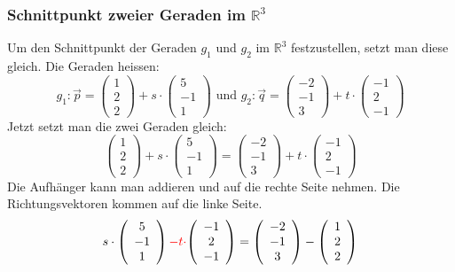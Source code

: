 \subsubsection{Schnittpunkt zweier Geraden im $\mathbb{R}^3$}
Um den Schnittpunkt der Geraden $g_1$ und $g_2$ im $\mathbb{R}^3$ festzustellen, setzt man
diese gleich. Die Geraden heissen:
\[ g_1 : \vec{p} = \left( \begin{array}{c} 1 \\2 \\2 \end{array} \right)
  + s \cdot \left( \begin{array}{c} 5 \\ -1 \\ 1 \end{array} \right)
  \text{ und }
  g_2 : \vec{q} = \left( \begin{array}{c} -2 \\-1 \\3 \end{array} \right)
  + t \cdot \left( \begin{array}{c} -1 \\ 2 \\ -1 \end{array} \right) \]
Jetzt setzt man die zwei Geraden gleich:
\[ \left( \begin{array}{c} 1 \\2 \\2 \end{array} \right)
  + s \cdot \left( \begin{array}{c} 5 \\ -1 \\ 1 \end{array} \right)
  = \left( \begin{array}{c} -2 \\-1 \\3 \end{array} \right)
  + t \cdot \left( \begin{array}{c} -1 \\ 2 \\ -1 \end{array} \right) \]
Die Aufhänger kann man addieren und auf die rechte Seite nehmen. Die
Richtungsvektoren kommen auf die linke Seite.
\[
  s \cdot \left( \begin{array}{c} 5 \\ -1 \\ 1 \end{array} \right)
  \color{red}{-t \cdot} \color{black}{\left( \begin{array}{c} -1 \\ 2 \\ -1 \end{array} \right)}
  = \left( \begin{array}{c} -2 \\-1 \\3 \end{array} \right) -
  \left( \begin{array}{c} 1 \\2 \\2 \end{array} \right)
\]
